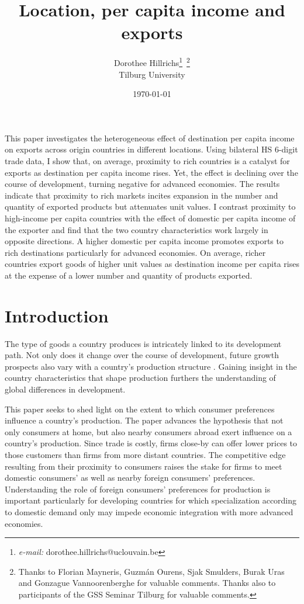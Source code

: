 \documentclass[12pt,a4paper,oneside,times]{article}   	%
\title{Location, per capita income and exports}  %
\author{Dorothee Hillrichs\thanks{\emph{e-mail:}  dorothee.hillrichs@uclouvain.be }~\thanks{Thanks to Florian Mayneris, Guzm\'{a}n Ourens, Sjak Smulders, Burak Uras and Gonzague Vannoorenberghe for valuable comments. Thanks also to participants of the GSS Seminar Tilburg for valuable comments.} 
\\ \small{Tilburg University}} %
\date{\today}
\begin{document}
\maketitle  %
\abstract 
\noindent 
This paper investigates the heterogeneous effect of destination per capita income on exports across origin countries in different locations. Using bilateral HS 6-digit trade data, I show that, on average, proximity to rich countries is a catalyst for exports as destination per capita income rises. Yet, the effect is declining over the course of development, turning negative for advanced economies. The results indicate that proximity to rich markets incites expansion in the number and quantity of exported products but attenuates unit values. I contrast proximity to high-income per capita countries with the effect of domestic per capita income of the exporter and find that the two country characteristics work largely in opposite directions. A higher domestic per capita income promotes exports to rich destinations particularly for advanced economies. On average, richer countries export goods of higher unit values as destination income per capita rises at the expense of a lower number and quantity of products exported.  

\section{Introduction}

The type of goods a country produces is intricately linked to its development path. Not only does it change over the course of development, future growth prospects also vary with a country's production structure \citep{Hausmann2007}. Gaining insight in the country characteristics that shape production  furthers the understanding of global differences in development. 

This paper seeks to shed light on the extent to which consumer preferences influence a country's production. The paper advances the hypothesis that not only consumers at home, but also nearby consumers abroad exert influence on a country's production. Since trade is costly, firms close-by can offer lower prices to those customers than firms from more distant countries. The competitive edge resulting from their proximity to consumers raises the stake for firms to meet domestic consumers' as well as nearby foreign consumers' preferences. Understanding the role of foreign consumers' preferences for production is important particularly for developing countries for which  specialization according to domestic demand only may impede economic integration with more advanced economies.
\end{document}
